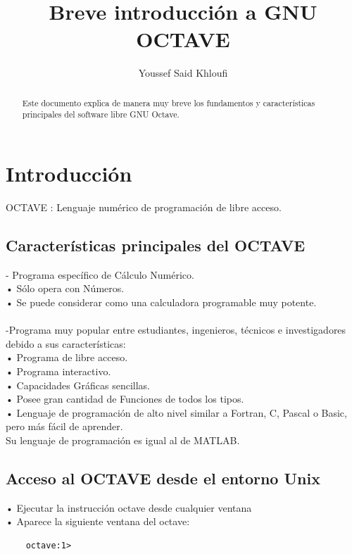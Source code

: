 \documentclass[a4,12pt]{article}
\title{Breve introducción a GNU OCTAVE}
\author{Youssef Said Khloufi}
\begin{document}
\maketitle

\begin{abstract}
Este documento explica de manera muy breve los fundamentos y características principales del software libre GNU Octave.

\end{abstract}

\tableofcontents
\newpage

\section{Introducción}

OCTAVE : Lenguaje numérico de programación de libre acceso.

\subsection{Características principales del OCTAVE}

- Programa específico de Cálculo Numérico.\\
• Sólo opera con Números.\\
• Se puede considerar como una calculadora programable muy potente.\\
\medskip\\
-Programa muy popular entre estudiantes, ingenieros, técnicos e investigadores debido a sus características:\\
• Programa de libre acceso.\\
• Programa interactivo.\\
• Capacidades Gráficas sencillas.\\
• Posee gran cantidad de Funciones de todos los tipos.\\
• Lenguaje de programación de alto nivel similar a Fortran, C, Pascal o Basic, pero más  fácil de aprender.\\
Su lenguaje de programación es igual al de MATLAB.\\

\subsection{Acceso al OCTAVE desde el entorno Unix}

• Ejecutar la instrucción octave desde cualquier ventana\\
• Aparece la siguiente ventana del octave:\\
\begin{verbatim}
    octave:1>
\end{verbatim}
\end{document}
